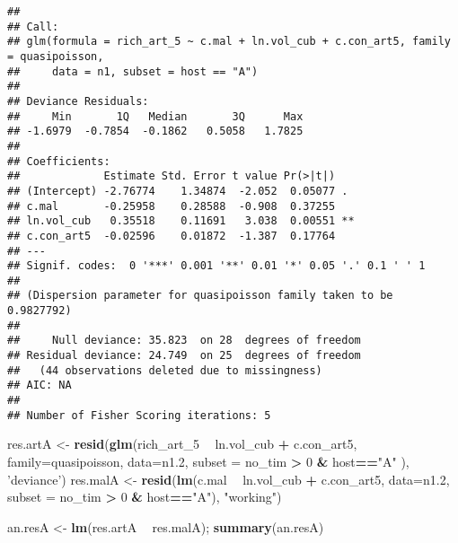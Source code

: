 \documentclass[]{article}
\newenvironment{Shaded}{\begin{snugshade}}{\end{snugshade}}
\newcommand{\KeywordTok}[1]{\textcolor[rgb]{0.13,0.29,0.53}{\textbf{#1}}}
\newcommand{\DataTypeTok}[1]{\textcolor[rgb]{0.13,0.29,0.53}{#1}}
\newcommand{\DecValTok}[1]{\textcolor[rgb]{0.00,0.00,0.81}{#1}}
\newcommand{\StringTok}[1]{\textcolor[rgb]{0.31,0.60,0.02}{#1}}
\newcommand{\OperatorTok}[1]{\textcolor[rgb]{0.81,0.36,0.00}{\textbf{#1}}}
\newcommand{\NormalTok}[1]{#1}
\begin{document}
\begin{verbatim}
## 
## Call:
## glm(formula = rich_art_5 ~ c.mal + ln.vol_cub + c.con_art5, family = quasipoisson, 
##     data = n1, subset = host == "A")
## 
## Deviance Residuals: 
##     Min       1Q   Median       3Q      Max  
## -1.6979  -0.7854  -0.1862   0.5058   1.7825  
## 
## Coefficients:
##             Estimate Std. Error t value Pr(>|t|)   
## (Intercept) -2.76774    1.34874  -2.052  0.05077 . 
## c.mal       -0.25958    0.28588  -0.908  0.37255   
## ln.vol_cub   0.35518    0.11691   3.038  0.00551 **
## c.con_art5  -0.02596    0.01872  -1.387  0.17764   
## ---
## Signif. codes:  0 '***' 0.001 '**' 0.01 '*' 0.05 '.' 0.1 ' ' 1
## 
## (Dispersion parameter for quasipoisson family taken to be 0.9827792)
## 
##     Null deviance: 35.823  on 28  degrees of freedom
## Residual deviance: 24.749  on 25  degrees of freedom
##   (44 observations deleted due to missingness)
## AIC: NA
## 
## Number of Fisher Scoring iterations: 5
\end{verbatim}

\begin{Shaded}
\begin{Highlighting}[]
\NormalTok{res.artA <-}\StringTok{ }\KeywordTok{resid}\NormalTok{(}\KeywordTok{glm}\NormalTok{(rich_art_}\DecValTok{5} \OperatorTok{~}\StringTok{ }\NormalTok{ln.vol_cub }\OperatorTok{+}\StringTok{ }\NormalTok{c.con_art5,}
           \DataTypeTok{family=}\NormalTok{quasipoisson, }\DataTypeTok{data=}\NormalTok{n1.}\DecValTok{2}\NormalTok{, }\DataTypeTok{subset =}\NormalTok{ no_tim }\OperatorTok{>}\StringTok{ }\DecValTok{0} \OperatorTok{&}\StringTok{ }\NormalTok{host}\OperatorTok{==}\StringTok{"A"}\NormalTok{ ), }\StringTok{'deviance'}\NormalTok{)}
\NormalTok{res.malA <-}\StringTok{ }\KeywordTok{resid}\NormalTok{(}\KeywordTok{lm}\NormalTok{(c.mal }\OperatorTok{~}\StringTok{ }\NormalTok{ln.vol_cub }\OperatorTok{+}\StringTok{ }\NormalTok{c.con_art5,}
           \DataTypeTok{data=}\NormalTok{n1.}\DecValTok{2}\NormalTok{, }\DataTypeTok{subset =}\NormalTok{ no_tim }\OperatorTok{>}\StringTok{ }\DecValTok{0} \OperatorTok{&}\StringTok{ }\NormalTok{host}\OperatorTok{==}\StringTok{"A"}\NormalTok{), }\StringTok{"working"}\NormalTok{)}

\NormalTok{an.resA <-}\StringTok{ }\KeywordTok{lm}\NormalTok{(res.artA }\OperatorTok{~}\StringTok{ }\NormalTok{res.malA); }\KeywordTok{summary}\NormalTok{(an.resA)}
\end{Highlighting}
\end{Shaded}
\end{document}
